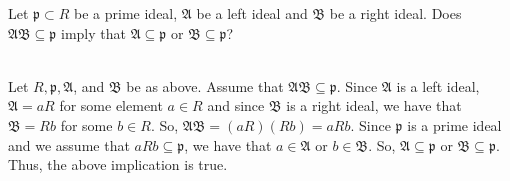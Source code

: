 Let $\mathfrak{p}\subset R$ be a prime ideal, $\mathfrak{A}$ be a left ideal and $\mathfrak{B}$ be
a right ideal. Does $\mathfrak{A}\mathfrak{B}\subseteq\mathfrak{p}$ imply that
$\mathfrak{A}\subseteq\mathfrak{p}$ or $\mathfrak{B}\subseteq\mathfrak{p}$?\\

\begin{solution}\renewcommand{\qedsymbol}{}\ \\
    Let $R, \mathfrak{p}, \mathfrak{A}$, and $\mathfrak{B}$ be as above. Assume that
    $\mathfrak{A}\mathfrak{B}\subseteq\mathfrak{p}$. Since $\mathfrak{A}$ is a left ideal,
    $\mathfrak{A}=aR$ for some element $a\in R$ and since $\mathfrak{B}$ is a right ideal, we have that
    $\mathfrak{B}=Rb$ for some $b\in R$. So, $\mathfrak{A}\mathfrak{B}=(aR)(Rb)=aRb$. Since
    $\mathfrak{p}$ is a prime ideal and we assume that $aRb\subseteq\mathfrak{p}$, we have that
    $a\in\mathfrak{A}$ or $b\in\mathfrak{B}$. So, $\mathfrak{A}\subseteq\mathfrak{p}$ or
    $\mathfrak{B}\subseteq\mathfrak{p}$. Thus, the above implication is true.

\end{solution}